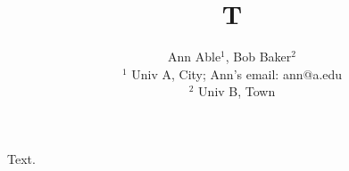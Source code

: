 \documentclass{article}
\begin{document}
\title{T}
\author{Ann Able$^1$, Bob Baker$^2$ \\
$^1$ Univ A, City; Ann's email: ann@a.edu \\
$^2$ Univ B, Town}
\maketitle
Text.
\end{document}
